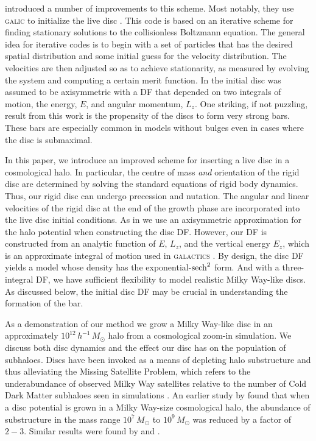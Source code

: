 \citet{YurinSpringelStellarDisks} introduced a number of improvements
to this scheme.  Most notably, they use \textsc{galic} to initialize
the live disc \citep{YurinSpringelGalic}.  This code is based on an
iterative scheme for finding stationary solutions to the collisionless
Boltzmann equation.  The general idea for iterative codes is to begin with a set of
particles that has the desired spatial distribution and some initial
guess for the velocity distribution.  The velocities are then adjusted
so as to achieve stationarity, as measured by evolving the system and
computing a certain merit function.  In
\citet{YurinSpringelStellarDisks} the initial disc was assumed to be
axisymmetric with a DF that depended on two integrals of motion, the
energy, $E$, and angular momentum, $L_z$. One striking, if not puzzling,
result from this work is the propensity of the discs to form very
strong bars.  These bars are especially common in models without
bulges even in cases where the disc is submaximal.

In this paper, we introduce an improved scheme for inserting a live
disc in a cosmological halo.  In particular, the centre of mass {\it
  and} orientation of the rigid disc are determined by solving the
standard equations of rigid body dynamics.  Thus, our rigid disc can
undergo precession and nutation.  The angular and linear velocities of
the rigid disc at the end of the growth phase are incorporated into
the live disc initial conditions.  As in
\citet{YurinSpringelStellarDisks} we use an axisymmetric approximation
for the halo potential when constructing the disc DF.  However, our DF
is constructed from an analytic function of $E$, $L_z$, and the
vertical energy $E_z$, which is an approximate integral of motion used
in \textsc{galactics} \citep{DubinskiKuijkenRigidDisks,
  WPDGalactICSReference}.  By design, the disc DF yields a model whose
density has the exponential-${\rm sech}^2$ form.  And with a
three-integral DF, we have sufficient flexibility to model realistic
Milky Way-like discs.  As discussed below, the initial disc DF may be
crucial in understanding the formation of the bar.

As a demonstration of our method we grow a Milky Way-like disc in an approximately
$10^{12}\,h^{-1}\,M_\odot$ halo from a cosmological zoom-in
simulation.  We discuss both disc dynamics and the effect our disc has
on the population of subhaloes.  Discs have been invoked as a means of
depleting halo substructure and thus alleviating the Missing Satellite
Problem, which refers to the underabundance of observed Milky Way
satellites relative to the number of Cold Dark Matter subhaloes seen
in simulations \citep{mooresubhalos,Klypin1999}.  An earlier study by
\citet{DOhngiaSubstructureDepletion} found that when a disc potential
is grown in a Milky Way-size cosmological halo, the abundance of
substructure in the mass range $10^7\,M_\odot$ to $10^9\,M_\odot$ was
reduced by a factor of $2-3$.  Similar results were found by
\citet{Sawala2017} and \citet{GKSubhaloDepletion17}.

